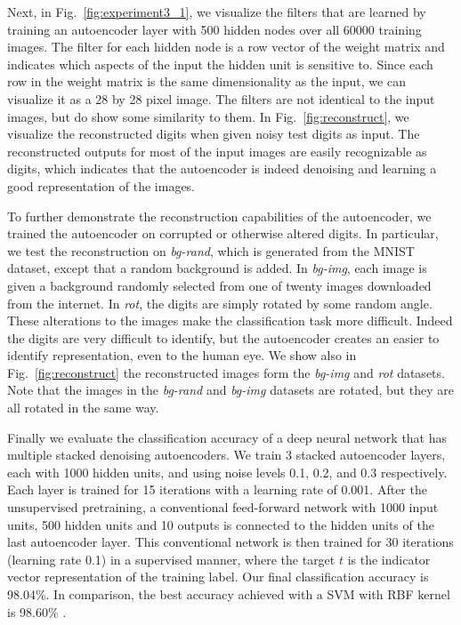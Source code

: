 Next, in Fig.~\ref{fig:experiment3_1}, we visualize the filters that are
learned by training an autoencoder layer with 500 hidden nodes over all 60000
training images. The  filter for each hidden node is a row vector of the weight
matrix and indicates which aspects of the input the hidden unit is sensitive
to. Since each row in the weight matrix is the same dimensionality as the
input, we can visualize it as a 28 by 28 pixel image. The filters are not
identical to the input images, but do show some similarity to them. In
Fig.~\ref{fig:reconstruct}, we visualize the reconstructed digits when given
noisy test digits as input. The reconstructed outputs for most of the input
images are easily recognizable as digits, which indicates that the autoencoder
is indeed denoising and learning a good representation of the images.

To further demonstrate the reconstruction capabilities of the autoencoder, we
trained the autoencoder on corrupted or otherwise altered digits.  In
particular, we test the reconstruction on \textit{bg-rand}, which is generated
from the MNIST dataset, except that a random background is added. In
\textit{bg-img}, each image is given a background randomly selected from one of
twenty images downloaded from the internet. In \textit{rot}, the digits are
simply rotated by some random angle.  These alterations to the images make the
classification task more difficult. Indeed the digits are very difficult to
identify, but the autoencoder creates an easier to identify representation,
even to the human eye. We show also in Fig.~\ref{fig:reconstruct} the
reconstructed images form the \textit{bg-img} and \textit{rot} datasets. Note
that the images in the \textit{bg-rand} and \textit{bg-img} datasets are
rotated, but they are all rotated in the same way.

Finally we evaluate the classification accuracy of a deep neural network that
has multiple stacked denoising autoencoders. We train 3 stacked autoencoder
layers, each with 1000 hidden units, and using noise levels 0.1, 0.2, and 0.3
respectively. Each layer is trained for 15 iterations with a learning rate of
0.001. After the unsupervised pretraining, a conventional feed-forward network
with 1000 input units, 500 hidden units and 10 outputs is connected to the
hidden units of the last autoencoder layer. This conventional network is then
trained for 30 iterations (learning rate 0.1) in a supervised manner, where the
target $t$ is the indicator vector representation of the training label. Our
final classification accuracy is 98.04\%. In comparison, the best accuracy achieved
with a SVM with RBF kernel is 98.60\% \cite{vincent2010stacked}.

